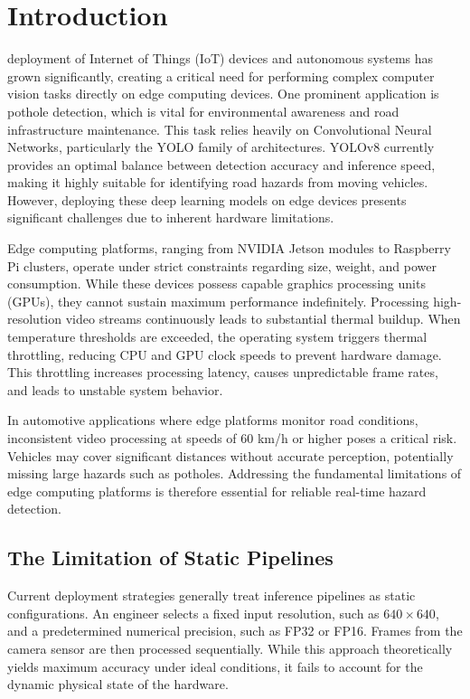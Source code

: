 \documentclass{ieeeaccess}
\begin{document}
\titlepgskip=-15pt

\maketitle

\section{Introduction}
\label{sec:introduction}
 deployment of Internet of Things (IoT) devices and autonomous systems has grown significantly, creating a critical need for performing complex computer vision tasks directly on edge computing devices. One prominent application is pothole detection, which is vital for environmental awareness and road infrastructure maintenance. This task relies heavily on Convolutional Neural Networks, particularly the YOLO family of architectures. YOLOv8 currently provides an optimal balance between detection accuracy and inference speed, making it highly suitable for identifying road hazards from moving vehicles. However, deploying these deep learning models on edge devices presents significant challenges due to inherent hardware limitations.

Edge computing platforms, ranging from NVIDIA Jetson modules to Raspberry Pi clusters, operate under strict constraints regarding size, weight, and power consumption. While these devices possess capable graphics processing units (GPUs), they cannot sustain maximum performance indefinitely. Processing high-resolution video streams continuously leads to substantial thermal buildup. When temperature thresholds are exceeded, the operating system triggers thermal throttling, reducing CPU and GPU clock speeds to prevent hardware damage. This throttling increases processing latency, causes unpredictable frame rates, and leads to unstable system behavior.

In automotive applications where edge platforms monitor road conditions, inconsistent video processing at speeds of 60 km/h or higher poses a critical risk. Vehicles may cover significant distances without accurate perception, potentially missing large hazards such as potholes. Addressing the fundamental limitations of edge computing platforms is therefore essential for reliable real-time hazard detection.

\subsection{The Limitation of Static Pipelines}
Current deployment strategies generally treat inference pipelines as static configurations. An engineer selects a fixed input resolution, such as $640 \times 640$, and a predetermined numerical precision, such as FP32 or FP16. Frames from the camera sensor are then processed sequentially. While this approach theoretically yields maximum accuracy under ideal conditions, it fails to account for the dynamic physical state of the hardware.
\end{document}
